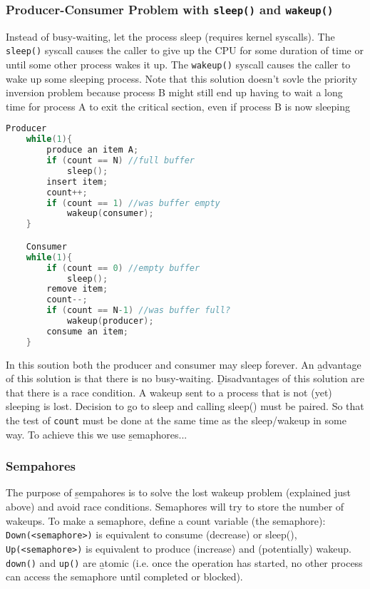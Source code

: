 \documentclass{article}
\begin{document}
    \subsubsection{Producer-Consumer Problem with \texttt{sleep()} and \texttt{wakeup()}}

    Instead of busy-waiting, let the process sleep (requires kernel syscalls). The \texttt{sleep()} syscall causes the caller to give up the CPU for some duration of time or until some other process wakes it up. The \texttt{wakeup()} syscall causes the caller to wake up some sleeping process. Note that this solution doesn't sovle the priority inversion problem because process B might still end up having to wait a long time for process A to exit the critical section, even if process B is now sleeping

    \begin{lstlisting}[language=C]
    Producer
    while(1){
        produce an item A;
        if (count == N) //full buffer
            sleep();
        insert item; 
        count++;
        if (count == 1) //was buffer empty
            wakeup(consumer);
    }

    Consumer
    while(1){
        if (count == 0) //empty buffer
            sleep();
        remove item;
        count--;
        if (count == N-1) //was buffer full?
            wakeup(producer);
        consume an item;
    }
    \end{lstlisting}

    \noindent In this soution both the producer and consumer may sleep forever. An \b{advantage} of this solution is that there is no busy-waiting. \b{Disadvantages} of this solution are that there is a race condition. A wakeup sent to a process that is not (yet) sleeping is lost. Decision to go to sleep and calling sleep() must be paired. So that the test of \texttt{count} must be done at the same time as the sleep/wakeup in some way. To achieve this we use \b{semaphores}...

    \subsubsection{Sempahores}

    The purpose of \b{sempahores} is to solve the lost wakeup problem (explained just above) and avoid race conditions. Semaphores will try to store the number of wakeups. To make a semaphore, define a count variable (the semaphore): \texttt{Down(<semaphore>)} is equivalent to consume (decrease) or sleep(), \texttt{Up(<semaphore>)} is equivalent to produce (increase) and (potentially) wakeup. \texttt{down()} and \texttt{up()} are \b{atomic} (i.e. once the operation has started, no other process can access the semaphore until completed or blocked). \\ 
\end{document}
